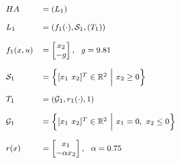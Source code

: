 \begin{center}
    \begin{minipage}[l]{0.3\columnwidth}
        \begin{center}
        \end{center}
    \end{minipage}
    \begin{minipage}[l]{0.6\columnwidth}
        \begin{equation*}
            \footnotesize
            \begin{array}{ll}
                HA            & = (L_1)                                                             \\
                & {\tiny ~}                                                           \\
                L_1           & = (f_1(\cdot),\mathcal{S}_1,(T_1))                                  \\
                & {\tiny ~}                                                           \\
                f_1(x,u)      & = \begin{bmatrix}
                                      x_2 \\ -g
                \end{bmatrix}, ~~ g = 9.81              \\
                & {\tiny ~}          \\
                \mathcal{S}_1              & = \Big \{ [x_1 ~x_2]^T \in \mathbb{R}^2~\Big |~ x_2 \geq 0 \Big \}                                                           \\
                & {\tiny ~}                                      \\
                T_1              & = (\mathcal{G}_1,r_1(\cdot),1)                                                           \\
                & {\tiny ~} \\
                \mathcal{G}_1              & = \Big \{ [x_1 ~x_2]^T \in \mathbb{R}^2~\Big |~ x_1 = 0,~x_2 \leq 0 \Big \}                                                           \\
                & {\tiny ~}                                               \\
                r(x)          & = \begin{bmatrix}
                                      x_1 \\ -\alpha x_2
                \end{bmatrix}, ~~ \alpha = 0.75
            \end{array}
        \end{equation*}
    \end{minipage}
     \label{fig:bouncingBall}
\end{center}

